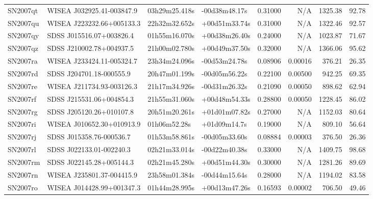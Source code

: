 \begin{longtable}{llllrrrr}
SN2007qt         &       WISEA J032925.41-003847.9 &   03h29m25.418s &   -00d38m48.17s &  0.31000 &      N/A &  1325.38 &       92.78 \\
SN2007qu         &       WISEA J223232.66+005133.3 &   22h32m32.652s &   +00d51m33.74s &  0.31000 &      N/A &  1322.46 &       92.57 \\
SN2007qy         &        SDSS J015516.07+003826.4 &   01h55m16.070s &   +00d38m26.40s &  0.24000 &      N/A &  1023.87 &       71.67 \\
SN2007qz         &        SDSS J210002.78+004937.5 &   21h00m02.780s &   +00d49m37.50s &  0.32000 &      N/A &  1366.06 &       95.62 \\
SN2007ra         &       WISEA J233424.11-005324.7 &   23h34m24.096s &   -00d53m24.78s &  0.08906 &  0.00016 &   376.21 &       26.35 \\
SN2007rd         &        SDSS J204701.18-000555.9 &   20h47m01.199s &   -00d05m56.22s &  0.22100 &  0.00500 &   942.25 &       69.35 \\
SN2007re         &       WISEA J211734.93-003126.3 &   21h17m34.926s &   -00d31m26.32s &  0.21090 &  0.00050 &   898.62 &       62.94 \\
SN2007rf         &        SDSS J215531.06+004854.3 &   21h55m31.060s &   +00d48m54.33s &  0.28800 &  0.00050 &  1228.45 &       86.02 \\
SN2007rg         &        SDSS J205120.26+010107.8 &   20h51m20.261s &   +01d01m07.82s &  0.27000 &      N/A &  1152.03 &       80.64 \\
SN2007ri         &       WISEA J010652.30+010913.9 &    01h06m52.28s &    +01d09m14.7s &  0.19000 &      N/A &   809.10 &       56.64 \\
SN2007rj         &        SDSS J015358.76-000536.7 &   01h53m58.861s &   -00d05m33.60s &  0.08884 &  0.00003 &   376.50 &       26.36 \\
SN2007rl         &        SDSS J022133.01-002240.3 &   02h21m33.014s &   -00d22m40.38s &  0.33000 &      N/A &  1409.75 &       98.68 \\
SN2007rm         &        SDSS J022145.28+005144.3 &   02h21m45.280s &   +00d51m44.30s &  0.30000 &      N/A &  1281.26 &       89.69 \\
SN2007rn         &       WISEA J235801.37-004415.9 &   23h58m01.384s &   -00d44m15.64s &  0.28000 &      N/A &  1194.02 &       83.58 \\
SN2007ro         &       WISEA J014428.99+001347.3 &   01h44m28.995s &   +00d13m47.26s &  0.16593 &  0.00002 &   706.50 &       49.46 \\

\end{longtable}
